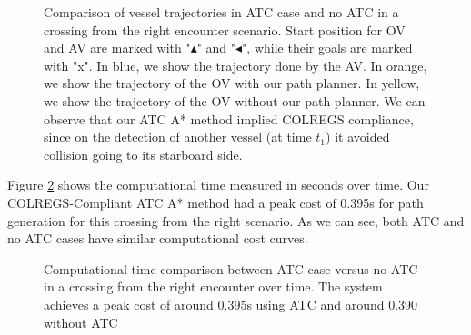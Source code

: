         \begin{figure}
            \centering
            
            \caption{Comparison of vessel trajectories in \ac{ATC} case and no \ac{ATC} in a crossing from the right encounter scenario. Start position for \ac{OV} and \ac{AV} are marked with "$\blacktriangle$" and "$\blacktriangleleft$", while their goals are marked with "x". In blue, we show the trajectory done by the \ac{AV}. In orange, we show the trajectory of the \ac{OV} with our path planner. In yellow, we show the trajectory of the \ac{OV} without our path planner. We can observe that our \ac{ATC} A* method implied \ac{COLREGS} compliance, since on the detection of another vessel (at time $t_1$) it avoided collision going to its starboard side.}
            \label{fig:plot_cr_w_vs_wo}
        \end{figure}

        Figure \ref{fig:plot_cr_w_vs_wo_CT} shows the computational time measured in seconds over time. Our \ac{COLREGS}-Compliant \ac{ATC} A* method had a peak cost of 0.395s for path generation for this crossing from the right scenario. As we can see, both \ac{ATC} and no \ac{ATC} cases have similar computational cost curves.
        
        \begin{figure}[H]
            \centering
                
                \caption{Computational time comparison between \ac{ATC} case versus no \ac{ATC} in a crossing from the right encounter over time. The system achieves a peak cost of around 0.395s using \ac{ATC} and around 0.390 without \ac{ATC}}
                \label{fig:plot_cr_w_vs_wo_CT}
        \end{figure}
        
        
